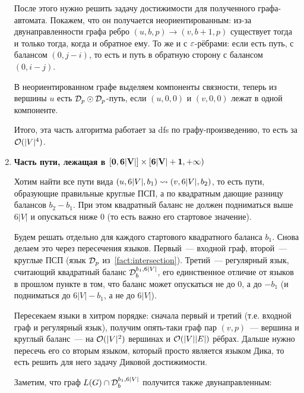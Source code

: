 \begin{enumerate}
    После этого нужно решить задачу достижимости для полученного графа-автомата. Покажем, что он получается неориентированным: из-за двунаправленности графа ребро $(u, b, p) \to (v, b+1, p)$ существует тогда и только тогда, когда и обратное ему. То же и с $\varepsilon$-рёбрами: если есть путь, с балансом $(0, j-i)$, то есть и путь в обратную сторону с балансом $(0, i-j)$.

    В неориентированном графе выделяем компоненты связности, теперь из вершины $u$ есть $\mathcal{D}_p \odot \mathcal{D}_p$-путь, если $(u, 0, 0)$ и $(v, 0, 0)$ лежат в одной компоненте.

    Итого, эта часть алгоритма работает за dfs по графу-произведению, то есть за $\mathcal{O}(|V|^4)$.

    \item {\bf Часть пути, лежащая в $\mathbf{[0, 6|V|] \times [6|V| + 1, +\infty)}$}

    Хотим найти все пути вида $(u, 6|V|, b_1) \rightsquigarrow (v, 6|V|, b_2)$, то есть пути, образующие правильные круглые ПСП, а по квадратным дающие разницу балансов $b_2 - b_1$. При этом квадратный баланс не должен подниматься выше $6|V|$ и опускаться ниже 0 (то есть важно его стартовое значение).

    Будем решать отдельно для каждого стартового квадратного баланса $b_1$. Снова делаем это через пересечения языков. Первый~--- входной граф, второй~--- круглые ПСП (язык $\mathcal{D}_p$ из~\ref{fact:intersection}). Третий~--- регулярный язык, считающий квадратный баланс $\mathcal{D}_b^{b_1, 6|V|}$, его единственное отличие от языков в прошлом пункте в том, что баланс может опускаться не до 0, а до $-b_1$ (и подниматься до $6|V| - b_1$, а не до $6|V|$).

    Пересекаем языки в хитром порядке: сначала первый и третий (т.е. входной граф и регулярный язык), получим опять-таки граф пар $(v, p)$~--- вершина и круглый баланс~--- на $\mathcal{O}(|V|^2)$ вершинах и $\mathcal{O}(|V||E|)$ рёбрах. Дальше нужно пересечь его со вторым языком, который просто является языком Дика, то есть решить для него задачу Диковой достижимости.

    Заметим, что граф $L(G) \cap \mathcal{D}_b^{b_1, 6|V|}$ получится также двунаправленным:


\end{enumerate}
